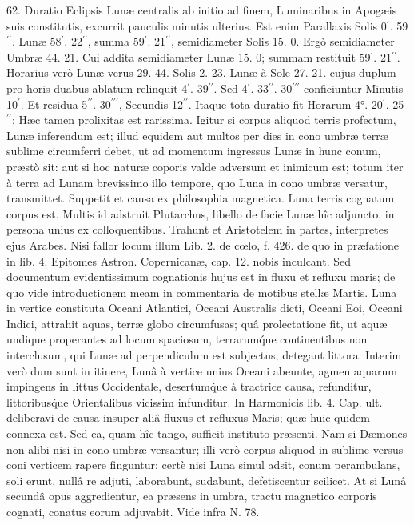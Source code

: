 \documentclass[a4paper, 11pt, oneside, polutonikogreek, german]{article}
\begin{document}
62. Duratio Eclipsis Lunæ centralis ab initio ad finem, Luminaribus in Apogæis suis constitutis, excurrit pauculis minutis ulterius. Est enim Parallaxis Solis 0$^{\prime}$. 59$^{\prime\prime}$. Lunæ 58$^{\prime}$. 22$^{\prime\prime}$, summa 59$^{\prime}$. 21$^{\prime\prime}$, semidiameter Solis 15. 0. Ergò semidiameter Umbræ 44. 21. Cui addita semidiameter Lunæ 15. 0; summam restituit 59$^{\prime}$. 21$^{\prime\prime}$. Horarius verò Lunæ verus 29. 44. Solis 2. 23. Lunæ à Sole 27. 21. cujus duplum pro horis duabus ablatum relinquit 4$^{\prime}$. 39$^{\prime\prime}$. Sed 4$^{\prime}$. 33$^{\prime\prime}$. 30$^{\prime\prime\prime}$ conficiuntur Minutis 10$^{\prime}$. Et residua 5$^{\prime\prime}$. 30$^{\prime\prime\prime}$, Secundis 12$^{\prime\prime}$. Itaque tota duratio fit Horarum 4°. 20$^{\prime}$. 25$^{\prime\prime}$: Hæc tamen prolixitas est rarissima. Igitur si corpus aliquod terris profectum, Lunæ inferendum est; illud equidem aut multos per dies in cono umbræ terræ sublime circumferri debet, ut ad momentum ingressus Lunæ in hunc conum, præstò sit: aut si hoc naturæ coporis valde adversum et inimicum est; totum iter à terra ad Lunam brevissimo illo tempore, quo Luna in cono umbræ versatur, transmittet. Suppetit et causa ex philosophia magnetica. Luna terris cognatum corpus est. Multis id adstruit Plutarchus, libello de facie Lunæ hîc adjuncto, in persona unius ex colloquentibus. Trahunt et Aristotelem in partes, interpretes ejus Arabes. Nisi fallor locum illum Lib. 2. de cœlo, f. 426. de quo in præfatione in lib. 4. Epitomes Astron. Copernicanæ, cap. 12. nobis inculcant. Sed documentum evidentissimum cognationis hujus est in fluxu et refluxu maris; de quo vide introductionem meam in commentaria de motibus stellæ Martis. Luna in vertice constituta Oceani Atlantici, Oceani Australis dicti, Oceani Eoi, Oceani Indici, attrahit aquas, terræ globo circumfusas; quâ prolectatione fit, ut aquæ undique properantes ad locum spaciosum, terrarum\'que continentibus non interclusum, qui Lunæ ad perpendiculum est subjectus, detegant littora. Interim verò dum sunt in itinere, Lunâ à vertice unius Oceani abeunte, agmen aquarum impingens in littus Occidentale, desertum\'que à tractrice causa, refunditur, littoribus\'que Orientalibus vicissim infunditur. In Harmonicis lib. 4. Cap. ult. deliberavi de causa insuper aliâ fluxus et refluxus Maris; quæ huic quidem connexa est. Sed ea, quam hîc tango, sufficit instituto præsenti. Nam si Dæmones non alibi nisi in cono umbræ versantur; illi verò corpus aliquod in sublime versus coni verticem rapere finguntur: certè nisi Luna simul adsit, conum perambulans, soli erunt, nullâ re adjuti, laborabunt, sudabunt, defetiscentur scilicet. At si Lunâ secundâ opus aggredientur, ea præsens in umbra, tractu magnetico corporis cognati, conatus eorum adjuvabit. Vide infra N. 78.
\end{document}

